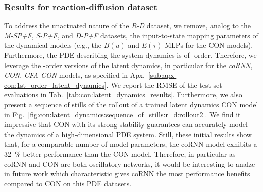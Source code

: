 \subsubsection{Results for reaction-diffusion dataset}
To address the unactuated nature of the \emph{R-D} dataset, we remove, analog to the \emph{M-SP+F}, \emph{S-P+F}, and \emph{D-P+F} datasets, the input-to-state mapping parameters of the dynamical models (e.g., the $B(u)$ and $E(\tau)$ \glspl{MLP} for the \gls{CON} models).
Furthermore, the \gls{PDE} describing the system dynamics is of -order. Therefore, we leverage the -order versions of the latent dynamics, in particular for the \emph{coRNN}, \emph{CON}, \emph{CFA-CON} models, as specified in Apx.~\ref{sub:apx-con:1st_order_latent_dynamics}.
We report the \gls{RMSE} of the test set evaluations in Tab.~\ref{tab:con:latent_dynamics_results}. Furthermore, we also present a sequence of stills of the rollout of a trained latent dynamics \gls{CON} model in Fig.~\ref{fig:con:latent_dynamics:sequence_of_stills:r_d:rollout2}.
We find it impressive that \gls{CON} with its strong stability guarantees can accurately model the dynamics of a high-dimensional \gls{PDE} system.
Still, these initial results show that, for a comparable number of model parameters, the \gls{coRNN} model exhibits a \SI{32}{\percent} better performance than the \gls{CON} model. Therefore, in particular as \gls{coRNN} and \gls{CON} are both oscillatory networks, it would be interesting to analze in future work which characteristic gives \gls{coRNN} the most performance benefits compared to \gls{CON} on this \gls{PDE} datasets.

